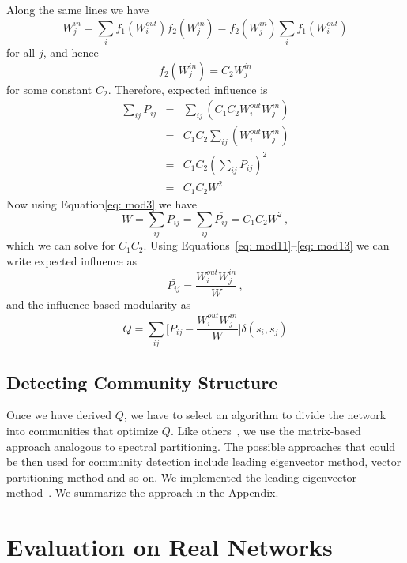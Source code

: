 \documentclass{sig-alternate}
\begin{document}
Along the same lines we have
\begin{equation}
\label{eq: mod7}
W_{j}^{in} = \sum_{i}{ f_1(W_{i}^{out})f_2(W_{j}^{in})}= f_2(W_{j}^{in})\sum_{i}{f_1(W_{i}^{out})}
\end{equation}
for all $j$, and hence
\begin{equation}
\label{eq: mod13}
 f_2(W_{j}^{in})= C_{2}{W_{j}^{in}}
\end{equation}
for some constant $C_2$. Therefore, expected influence is 
\begin{eqnarray*}
\sum_{ij} \bar{P_{ij}}& =&\sum_{ij} (C_{1}C_{2} {W_{i}^{out}}{W_{j}^{in}})  \\
& =&C_{1}C_{2} \sum_{ij} ({W_{i}^{out}}{W_{j}^{in}})  \\
& =&C_{1}C_{2} {(\sum_{ij} P_{ij})}^2  \\
& =& C_{1}C_{2} W^{2}
\end{eqnarray*}
Now using Equation\eqref{eq: mod3} we have
\begin{equation}
\label{eq: mod9}
 W=  \sum_{ij} P_{ij} =\sum_{ij} \bar{P_{ij}} = C_{1}C_{2} W^{2}\,,
\end{equation}
which we can solve for $C_1C_2$.
Using Equations~\ref{eq: mod11}--\ref{eq: mod13} we can write expected influence as
\begin{equation}
\label{eq: mod14}
\bar{P_{ij}} = \frac { {W_{i}^{out}} {W_{j}^{in}}}{W}\,,
\end{equation}
and the influence-based modularity as
 \begin{equation}
\label{eq: mod15}
 Q=\sum_{ij} {\big[P_{ij} - \frac { {W_{i}^{out}} {W_{j}^{in}}}{W}\big]\delta(s_i, s_j)}
 \end{equation}

\subsection{Detecting Community Structure}
Once we have derived $Q$, we have to select an algorithm to divide the network into communities that optimize $Q$. Like others~\cite{ Newman206,Newman106,Leicht}, we  use the matrix-based approach analogous to spectral  partitioning. The possible approaches that could be then used for community detection include leading eigenvector method, vector partitioning method and so on. We implemented the leading eigenvector method~\cite{Newman206}.
We summarize the approach in the Appendix.


\section{Evaluation on Real Networks}
\label{sec:evaluation}
\end{document}

